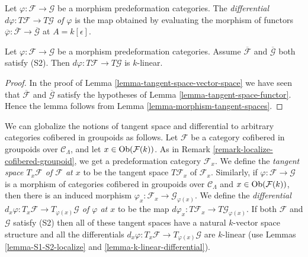 \begin{definition}
\label{definition-differential}
Let $\varphi: \mathcal{F} \to \mathcal{G}$ be a morphism predeformation
categories. The
{\it differential $d \varphi: T \mathcal{F} \to T \mathcal{G}$ of $\varphi$}
is the map obtained by evaluating the morphism of functors
$\overline{\varphi}: \overline{\mathcal{F}} \to \overline{\mathcal{G}}$
at $A = k[\epsilon]$.
\end{definition}

\begin{lemma}
\label{lemma-k-linear-differential}
Let $\varphi: \mathcal{F} \to \mathcal{G}$ be a morphism predeformation
categories. Assume $\overline{\mathcal{F}}$ and $\overline{\mathcal{G}}$ both
satisfy (S2). Then $d \varphi: T \mathcal{F} \to T \mathcal{G}$ is $k$-linear.
\end{lemma}

\begin{proof}
In the proof of
Lemma \ref{lemma-tangent-space-vector-space}
we have seen that $\overline{\mathcal{F}}$ and $\overline{\mathcal{G}}$
satisfy the hypotheses of
Lemma \ref{lemma-tangent-space-functor}.
Hence the lemma follows from
Lemma \ref{lemma-morphism-tangent-spaces}.
\end{proof}

\begin{remark}
\label{remark-tangent-space-cofibered-groupoid}
We can globalize the notions of tangent space and differential to arbitrary
categories cofibered in groupoids as follows. Let $\mathcal{F}$ be a category
cofibered in groupoids over $\mathcal{C}_\Lambda$, and let
$x \in \mathop{\rm Ob}\nolimits(\mathcal{F}(k))$. As in
Remark \ref{remark-localize-cofibered-groupoid},
we get a predeformation category $\mathcal{F}_x$. We define the
{\it tangent space $T_x \mathcal{F}$ of $\mathcal{F}$ at $x$}
to be the tangent space $T \mathcal{F}_x$ of
$\mathcal{F}_x$. Similarly, if
$\varphi: \mathcal{F} \to \mathcal{G}$ is a morphism of categories cofibered
in groupoids over $\mathcal{C}_\Lambda$ and $x \in \mathop{\rm Ob}\nolimits(\mathcal{F}(k))$,
then there is an induced morphism
$\varphi_x: \mathcal{F}_x \to \mathcal{G}_{\varphi(x)}$. We define the
{\it differential
$d_x \varphi: T_x \mathcal{F} \to T_{\varphi(x)} \mathcal{G}$
of $\varphi$ at $x$} to be the map
$d \varphi_x: T \mathcal{F}_x \to T \mathcal{G}_{\varphi(x)}$.
If both $\mathcal{F}$ and $\mathcal{G}$ satisfy (S2) then
all of these tangent spaces have a natural $k$-vector space structure
and all the differentials
$d_x \varphi: T_x \mathcal{F} \to T_{\varphi(x)} \mathcal{G}$
are $k$-linear (use
Lemmas \ref{lemma-S1-S2-localize} and \ref{lemma-k-linear-differential}).
\end{remark}

